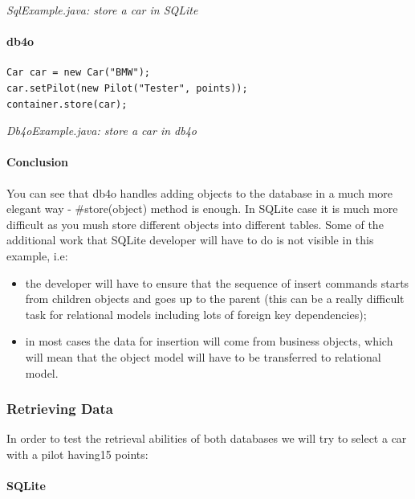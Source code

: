 {\small\itshape SqlExample.java: store a car in SQLite\par}
\medskip

\paragraph*{db4o}

\begin{lstlisting}
Car car = new Car("BMW");
car.setPilot(new Pilot("Tester", points));
container.store(car);
\end{lstlisting}

{\small\itshape Db4oExample.java: store a car in db4o\par}
\medskip

\paragraph*{Conclusion}

You can see that db4o handles adding objects to the database in a much more elegant way - \#store(object) method is enough. In SQLite case it is much more difficult as you mush store different objects into different tables. Some of the additional work that SQLite developer will have to do is not visible in this example, i.e:

\begin{itemize}
\item the developer will have to ensure that the sequence of insert commands starts from children objects and goes up to the parent (this can be a really difficult task for relational models including lots of foreign key dependencies);
\item in most cases the data for insertion will come from business objects, which will mean that the object model will have to be transferred to relational model.
\end{itemize}

\subsubsection{Retrieving Data}
\label{ref:platform-specific-issues-android-retrieving-data}

In order to test the retrieval abilities of both databases we will try to select a car with a pilot having15 points:

\paragraph*{SQLite}

